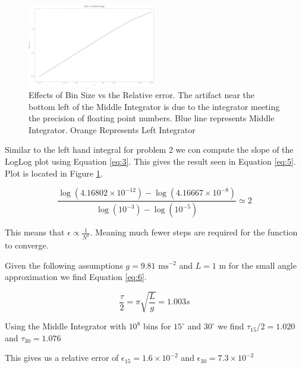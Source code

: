 \documentclass{article}
\begin{document}
\begin{figure}[ht]\label{fig:2}
\begin{center}
\includegraphics[width=0.5\textwidth]{error.pdf}
\end{center}
\caption{Effects of Bin Size vs the Relative error. The artifact near the bottom left of the Middle Integrator is due to the integrator meeting the precision of floating point numbers. Blue line represents Middle Integrator. Orange Represents Left Integrator}
\end{figure}

\bigskip
{}
\medskip

Similar to the left hand integral for problem 2 we con compute the slope of the LogLog plot using Equation \ref{eq:3}. This gives the result seen in Equation \ref{eq:5}. Plot is located in Figure \ref{fig:2}.

\begin{equation}\label{eq:5}
    \frac{\log(4.16802\times10^{-12})-\log(4.16667\times10^{-8})}{\log(10^{-3})-\log(10^{-5})} \simeq 2
\end{equation}{}

This means that $\epsilon \propto \frac{1}{N^2}$. Meaning much fewer steps are required for  the function to converge.

\bigskip
{}
\medskip

Given the following assumptions $ g = 9.81 \text{ ms}^{-2} $ and $ L=1\text{ m} $ for the small angle approximation we find Equation \ref{eq:6}. 

\begin{equation}\label{eq:6}
    \frac{\tau}{2} = \pi\sqrt{\frac{L}{g}} = 1.003s
\end{equation}

Using the Middle Integrator with $10^8$ bins for $ 15^\circ $ and $ 30^\circ $ we find $ \tau_{15}/2 = 1.020$ and $\tau_{30} = 1.076$

This gives us a relative error of $\epsilon_{15} = 1.6\times10^{-2}$ and $\epsilon_{30} = 7.3\times10^{-2}$ 
\end{document}
